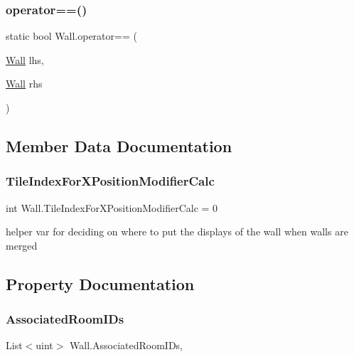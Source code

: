 \subsubsection{\texorpdfstring{operator==()}{operator==()}}
{\footnotesize\ttfamily static bool Wall.\+operator== (\begin{DoxyParamCaption}\item[{\mbox{\hyperlink{class_wall}{Wall}}}]{lhs,  }\item[{\mbox{\hyperlink{class_wall}{Wall}}}]{rhs }\end{DoxyParamCaption})\hspace{0.3cm}{\ttfamily [static]}}



\subsection{Member Data Documentation}
\mbox{\label{class_wall_a0923767dab07b7c3018ce3a6ceacd306}} 
\subsubsection{\texorpdfstring{Tile\+Index\+For\+X\+Position\+Modifier\+Calc}{TileIndexForXPositionModifierCalc}}
{\footnotesize\ttfamily int Wall.\+Tile\+Index\+For\+X\+Position\+Modifier\+Calc = 0\hspace{0.3cm}{\ttfamily [private]}}



helper var for deciding on where to put the displays of the wall when walls are merged 



\subsection{Property Documentation}
\mbox{\label{class_wall_aa49042aeda37b3ad734a101f1df834eb}} 
\subsubsection{\texorpdfstring{Associated\+Room\+I\+Ds}{AssociatedRoomIDs}}
{\footnotesize\ttfamily List$<$uint$>$ Wall.\+Associated\+Room\+I\+Ds\hspace{0.3cm}{\ttfamily [get]}, {}}



